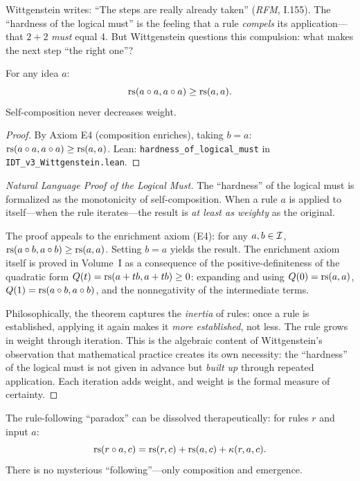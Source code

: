 Wittgenstein writes: ``The steps are really already taken'' (\textit{RFM},
I.155). The ``hardness of the logical must'' is the feeling that a rule
\emph{compels} its application---that $2 + 2$ \emph{must} equal 4. But
Wittgenstein questions this compulsion: what makes the next step ``the right one''?

\begin{theorem}
\label{thm:hardness-logical-must}
For any idea $a$:
\[
\mathrm{rs}(a \circ a, a \circ a) \geq \mathrm{rs}(a, a).
\]
Self-composition never decreases weight.
\end{theorem}

\begin{proof}
By Axiom E4 (composition enriches), taking $b = a$:
$\mathrm{rs}(a \circ a, a \circ a) \geq \mathrm{rs}(a, a)$.
Lean: \texttt{hardness\_of\_logical\_must} in
\texttt{IDT\_v3\_Wittgenstein.lean}.
\end{proof}

\begin{proof}[Natural Language Proof of the Logical Must]
The ``hardness'' of the logical must is formalized as the monotonicity of
self-composition. When a rule $a$ is applied to itself---when the rule
iterates---the result is \emph{at least as weighty} as the original.

The proof appeals to the enrichment axiom (E4): for any $a, b \in \mathcal{I}$,
$\mathrm{rs}(a \circ b, a \circ b) \geq \mathrm{rs}(a, a)$. Setting $b = a$ yields
the result. The enrichment axiom itself is proved in Volume~I as a consequence
of the positive-definiteness of the quadratic form
$Q(t) = \mathrm{rs}(a + tb, a + tb) \geq 0$: expanding and using $Q(0) = \mathrm{rs}(a,a)$,
$Q(1) = \mathrm{rs}(a \circ b, a \circ b)$, and the nonnegativity of the
intermediate terms.

Philosophically, the theorem captures the \emph{inertia} of rules: once a rule
is established, applying it again makes it \emph{more established}, not less.
The rule grows in weight through iteration. This is the algebraic content of
Wittgenstein's observation that mathematical practice creates its own
necessity: the ``hardness'' of the logical must is not given in advance but
\emph{built up} through repeated application. Each iteration adds weight,
and weight is the formal measure of certainty.
\end{proof}

\begin{theorem}
\label{thm:rule-following-dissolves}
The rule-following ``paradox'' can be dissolved therapeutically: for rules $r$
and input $a$:
\[
\mathrm{rs}(r \circ a, c) = \mathrm{rs}(r, c) + \mathrm{rs}(a, c) + \kappa(r, a, c).
\]
There is no mysterious ``following''---only composition and emergence.
\end{theorem}

